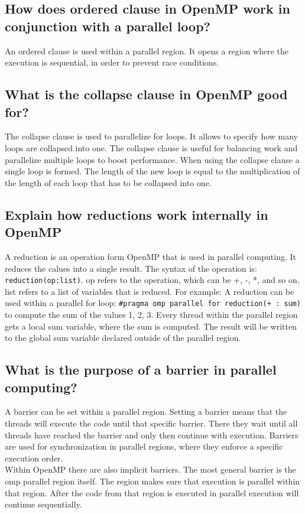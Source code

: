 \documentclass[runningheads]{llncs}
\begin{document}
\subsection{How does ordered clause in OpenMP work in conjunction with a parallel loop?}
An ordered clause is used within a parallel region. It opens a region where the execution is sequential, in order to prevent race conditions.


\subsection{What is the collapse clause in OpenMP good for?}
The collapse clause is used to parallelize for loops. It allows to specify how many loops are collapsed into one. The collapse clause is useful for balancing work and parallelize multiple loops to boost performance.
When using the collapse clause a single loop is formed. The length of the new loop is equal to the multiplication of the length of each loop that has to be collapsed into one.

\subsection{Explain how reductions work internally in OpenMP}
A reduction is an operation form OpenMP that is used in parallel computing. 
It reduces the calues into a single result.
The syntax of the operation is: \lstinline{reduction(op:list)}. op refers to the operation, which can be +, -, *, and so on. list refers to a list of variables that is reduced.
For example: A reduction can be used within a parallel for loop: 
\lstinline{#pragma omp parallel for reduction(+ : sum) } to compute the sum of the values 1, 2, 3. Every thread within the parallel region gets a local sum variable, where the sum is computed. The result will be written to the global sum variable declared outside of the parallel region.

\subsection{What is the purpose of a barrier in parallel computing?}
A barrier can be set within a parallel region. Setting a barrier means that the threads will execute the code until that specific barrier. There they wait until all threads have reached the barrier and only then continue with execution.
Barriers are used for synchronization in parallel regions, where they enforce a specific execution order. \\
Within OpenMP there are also implicit barriers. The most general barrier is the omp parallel region itself. The region makes sure that execution is parallel within that region. After the code from that region is executed in parallel execution will continue sequentially. 
\end{document}
